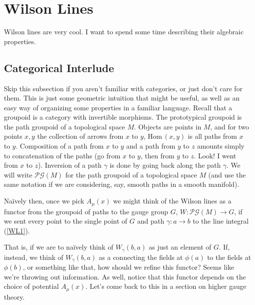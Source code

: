 \documentclass[main.tex]{subfiles}
\begin{document}
\section{Wilson Lines}
Wilson lines are very cool. I want to spend some time describing their algebraic properties.
\subsection{Categorical Interlude}
Skip this subsection if you aren't familiar with categories, or just don't care for them. This is just some geometric intuition that might be useful, as well as an easy way of organizing some properties in a familiar language. Recall that a groupoid is a category with invertible morphisms. The prototypical groupoid is the path groupoid of a topological space $M$. Objects are points in $M$, and for two points $x,y$ the collection of arrows from $x$ to $y$, $\text{Hom} \, (x,y)$ is all paths from $x$ to $y$. Composition of a path from $x$ to $y$ and a path from $y$ to $z$ amounts simply to concatenation of the paths (go from $x$ to $y$, then from $y$ to $z$. Look! I went from $x$ to $z$). Inversion of a path $\gamma$ is done by going back along the path $\gamma$. We will write $\mathcal{PG}(M)$ for the path groupoid of a topological space $M$ (and use the same notation if we are considering, say, smooth paths in a smooth manifold).

Na\"ively then, once we pick $A_\mu (x)$ we might think of the Wilson lines as a functor from the groupoid of paths to the gauge group $G$, $W: \mathcal{PG}(M) \rightarrow G$, if we sent every point to the single point of $G$ and path $\gamma: a \to b$ to the line integral (\ref{WL1}).

That is, if we are to na\"ively think of $W_\gamma(b,a)$ as just an element of $G$. If, instead, we think of $W_\gamma (b,a)$ as a connecting the fields at $\phi(a)$ to the fields at $\phi(b)$, or something like that, how should we refine this functor? Seems like we're throwing out information. As well, notice that this functor depends on the choice of potential $A_\mu (x)$. Let's come back to this in a section on higher gauge theory. 
\end{document}
